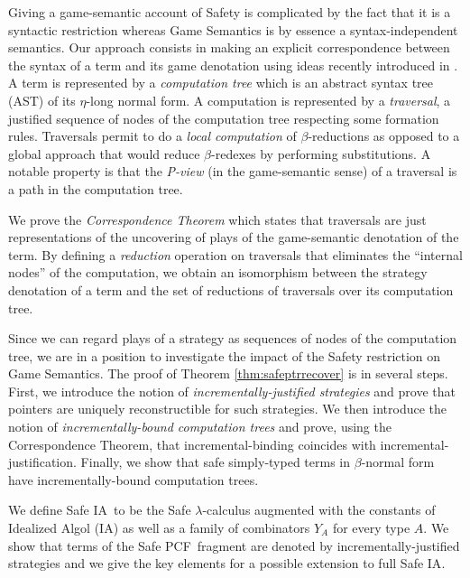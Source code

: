 \documentclass[12pt]{article}
\newcommand\ialgol{\textsf{IA}}
\newcommand\pcf{\textsf{PCF}}
\begin{document}
Giving a game-semantic account of Safety is complicated by the fact
that it is a syntactic restriction whereas Game Semantics is by
essence a syntax-independent semantics. Our approach consists in
making an explicit correspondence between the syntax of a term and
its game denotation using ideas recently introduced in
\cite{OngLics2006}. A term is represented by a \emph{computation
tree} which is an abstract syntax tree (AST) of its $\eta$-long
normal form. A computation is represented by a \emph{traversal}, a
justified sequence of nodes of the computation tree respecting some
formation rules. Traversals permit to do a \emph{local computation}
of $\beta$-reductions as opposed to a global approach that would
reduce $\beta$-redexes by performing substitutions. A notable
property is that the \emph{P-view} (in the game-semantic sense) of a
traversal is a path in the computation tree.

We prove the \emph{Correspondence Theorem} which states that
traversals are just representations of the uncovering of plays of
the game-semantic denotation of the term. By defining a
\emph{reduction} operation on traversals that eliminates the
``internal nodes'' of the computation, we obtain an isomorphism
between the strategy denotation of a term and the set of reductions
of traversals over its computation tree.

Since we can regard plays of a strategy as sequences of nodes of the
computation tree, we are in a position to investigate the impact of
the Safety restriction on Game Semantics. The proof of Theorem
\ref{thm:safeptrrecover} is in several steps. First, we introduce
the notion of \emph{incrementally-justified strategies} and prove
that pointers are uniquely reconstructible for such strategies. We
then introduce the notion of \emph{incrementally-bound computation
trees} and prove, using the Correspondence Theorem, that
incremental-binding coincides with incremental-justification.
Finally, we show that safe simply-typed terms in $\beta$-normal form
have incrementally-bound computation trees.

We define Safe \ialgol\ to be the Safe $\lambda$-calculus augmented
with the constants of Idealized Algol (\ialgol) as well as a family
of combinators $Y_A$ for every type $A$. We show that terms of the
Safe \pcf\ fragment are denoted by incrementally-justified
strategies and we give the key elements for a possible extension to
full Safe \ialgol.



\end{document}
